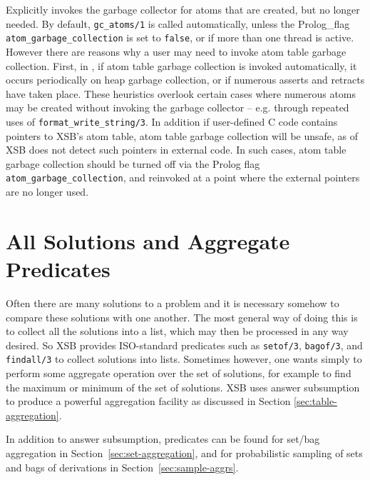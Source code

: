 \begin{description}
%
Explicitly invokes the garbage collector for atoms that are created,
but no longer needed.  By default, {\tt gc\_atoms/1} is called
automatically, unless the Prolog\_flag {\tt atom\_garbage\_collection}
is set to {\tt false}, or if more than one thread is active.  However
there are reasons why a user may need to invoke atom table garbage
collection.  First, in \version{}, if atom table garbage collection is
invoked automatically, it occurs periodically on heap garbage
collection, or if numerous asserts and retracts have taken place.
These heuristics overlook certain cases where numerous atoms may be
created without invoking the garbage collector -- e.g. through
repeated uses of {\tt format\_write\_string/3}.  In addition if
user-defined C code contains pointers to XSB's atom table, atom table
garbage collection will be unsafe, as \version{} of XSB does not
detect such pointers in external code.  In such cases, atom table
garbage collection should be turned off via the Prolog flag {\tt
  atom\_garbage\_collection}, and reinvoked at a point where the
external pointers are no longer used.

\end{description}


\section{All Solutions and Aggregate Predicates} \label{sec:setofs}
 
Often there are many solutions to a problem and it is necessary
somehow to compare these solutions with one another.  The most general
way of doing this is to collect all the solutions into a list, which
may then be processed in any way desired.  So XSB provides
ISO-standard predicates such as {\tt setof/3}, {\tt bagof/3}, and {\tt
findall/3} to collect solutions into lists.  Sometimes however, one
wants simply to perform some aggregate operation over the set of
solutions, for example to find the maximum or minimum of the set of
solutions.  XSB uses answer subsumption to produce a 
powerful aggregation facility as discussed in Section
\ref{sec:table-aggregation}.

In addition to answer subsumption, predicates can be found for set/bag
aggregation in Section~\ref{sec:set-aggregation}, and for
probabilistic sampling of sets and bags of derivations in
Section~\ref{sec:sample-aggrs}.

